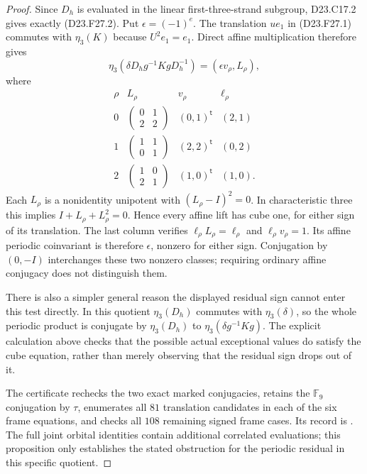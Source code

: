 \begin{proof}
Since $D_h$ is evaluated in the linear first-three-strand
subgroup, D23.C17.2 gives exactly (D23.F27.2).  Put
$\epsilon=(-1)^e$.  The translation $u e_1$ in (D23.F27.1)
commutes with $\eta_3(K)$ because $U^2e_1=e_1$.  Direct affine
multiplication therefore gives
\[
 \eta_3(\delta D_hg^{-1}KgD_h^{-1})
             =(\epsilon v_\rho,L_\rho),
\]
where
\[
\begin{array}{c|c|c|c}
 \rho&L_\rho&v_\rho&\ell_\rho\\\hline
 0&\left(\begin{smallmatrix}0&1\\2&2\end{smallmatrix}\right)
       &(0,1)^{\mathsf t}&(2,1)\\
 1&\left(\begin{smallmatrix}1&1\\0&1\end{smallmatrix}\right)
       &(2,2)^{\mathsf t}&(0,2)\\
 2&\left(\begin{smallmatrix}1&0\\2&1\end{smallmatrix}\right)
       &(1,0)^{\mathsf t}&(1,0).
\end{array}
\tag{D23.F27.8}
\]
Each $L_\rho$ is a nonidentity unipotent with
$(L_\rho-I)^2=0$.  In characteristic three this implies
$I+L_\rho+L_\rho^2=0$.  Hence every affine lift has cube one,
for either sign of its translation.  The last column verifies
$\ell_\rho L_\rho=\ell_\rho$ and
$\ell_\rho v_\rho=1$.  Its affine periodic coinvariant is
therefore $\epsilon$, nonzero for either sign.
Conjugation by $(0,-I)$ interchanges these two nonzero classes;
requiring ordinary affine conjugacy does not distinguish them.

There is also a simpler general reason the displayed residual
sign cannot enter this test directly.  In this quotient
$\eta_3(D_h)$ commutes with $\eta_3(\delta)$, so the whole
periodic product is conjugate by $\eta_3(D_h)$ to
$\eta_3(\delta g^{-1}Kg)$.  The explicit calculation above
checks that the possible actual exceptional values do satisfy
the cube equation, rather than merely observing that the
residual sign drops out of it.

The certificate 
rechecks the two exact marked conjugacies, retains the
$\mathbb F_9$ conjugation by $\tau$, enumerates all $81$
translation candidates in each of the six frame equations,
and checks all $108$ remaining signed frame cases.  Its
record is .  The full joint
orbital identities contain additional correlated evaluations;
this proposition only establishes the stated obstruction for
the periodic residual in this specific quotient.
\end{proof}
